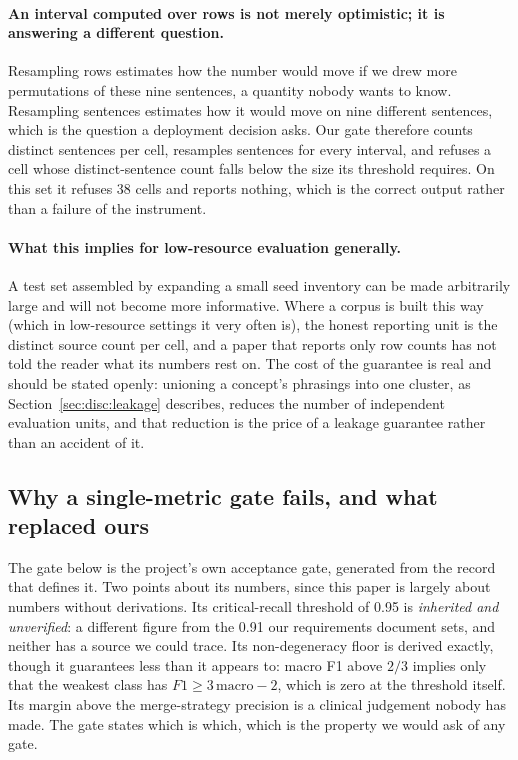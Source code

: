 \paragraph{An interval computed over rows is not merely optimistic; it is
answering a different question.} Resampling rows estimates how the number would
move if we drew more permutations of these nine sentences, a quantity nobody
wants to know. Resampling sentences estimates how it would move on nine different
sentences, which is the question a deployment decision asks. Our gate therefore
counts distinct sentences per cell, resamples sentences for every interval, and
refuses a cell whose distinct-sentence count falls below the size its threshold
requires. On this set it refuses 38 cells and reports nothing, which is the
correct output rather than a failure of the instrument.

\paragraph{What this implies for low-resource evaluation generally.} A test set
assembled by expanding a small seed inventory can be made arbitrarily large and
will not become more informative. Where a corpus is built this way (which in
low-resource settings it very often is), the honest reporting unit is the
distinct source count per cell, and a paper that reports only row counts has not
told the reader what its numbers rest on. The cost of the guarantee is real and
should be stated openly: unioning a concept's phrasings into one cluster, as
Section~\ref{sec:disc:leakage} describes, reduces the number of independent
evaluation units, and that reduction is the price of a leakage guarantee rather
than an accident of it.

\subsection{Why a single-metric gate fails, and what replaced ours}
\label{sec:disc:gate}

The gate below is the project's own acceptance gate, generated from the record
that defines it. Two points about its numbers, since this paper is largely about
numbers without derivations. Its critical-recall threshold of 0.95 is
\emph{inherited and unverified}: a different figure from the 0.91 our
requirements document sets, and neither has a source we could trace. Its
non-degeneracy floor is derived exactly, though it guarantees less than it
appears to: macro F1 above $2/3$ implies only that the weakest class has
$F1 \geq 3\,\mathrm{macro} - 2$, which is zero at the threshold itself. Its
margin above the merge-strategy precision is a clinical judgement nobody has
made. The gate states which is which, which is
the property we would ask of any gate.


